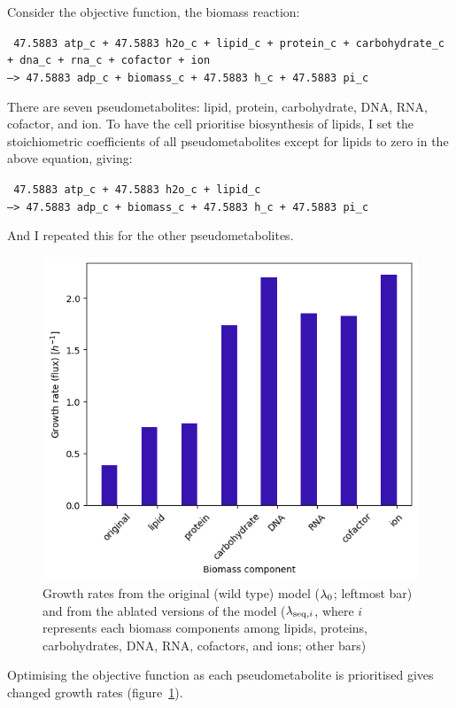 Consider the objective function, the biomass reaction:

\texttt{
  47.5883 atp\_c + 47.5883 h2o\_c + lipid\_c + protein\_c + carbohydrate\_c\\
  + dna\_c + rna\_c + cofactor + ion \\
  --> 47.5883 adp\_c + biomass\_c + 47.5883 h\_c + 47.5883 pi\_c
}

There are seven pseudometabolites: lipid, protein, carbohydrate, DNA, RNA, cofactor, and ion.
To have the cell prioritise biosynthesis of lipids, I set the stoichiometric coefficients of all pseudometabolites except for lipids to zero in the above equation, giving:

\texttt{
  47.5883 atp\_c + 47.5883 h2o\_c + lipid\_c \\
  --> 47.5883 adp\_c + biomass\_c + 47.5883 h\_c + 47.5883 pi\_c
}

And I repeated this for the other pseudometabolites.

\begin{figure}
  \centering
  \includegraphics[width=.6\linewidth]{ablation_example_fluxes.png}
  \caption{
    Growth rates from the original (wild type) model ($\lambda_{0}$; leftmost bar) and from the ablated versions of the model ($\lambda_{\mathrm{seq},i}$, where $i$ represents each biomass components among lipids, proteins, carbohydrates, DNA, RNA, cofactors, and ions; other bars)
  }
  \label{fig:model-ablate-fluxes}
\end{figure}

Optimising the objective function as each pseudometabolite is prioritised gives changed growth rates (figure~\ref{fig:model-ablate-fluxes}).

